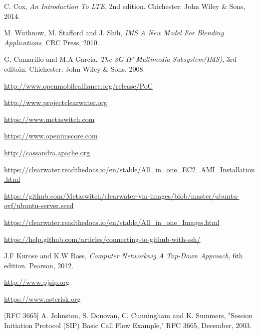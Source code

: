 \renewcommand\bibname{مراجع}
\begin{thebibliography}{99} %



\begin{LTRitems}

\resetlatinfont

C. Cox,  {\em An Introduction To LTE}, 2nd edition. Chichester: John Wiley \& Sons, 2014.

M. Wuthnow, M. Stafford and J. Shih,  {\em IMS A New Model For Blending Applications}. CRC Press, 2010.

G. Camarillo and M.A Garcia, {\em The 3G IP Multimedia Subsystem(IMS)}, 3rd editoin. Chichester: John Wiley \& Sons, 2008.

\url{http://www.openmobilealliance.org/release/PoC}

\url{http://www.projectclearwater.org}

\url{https://www.metaswitch.com}

\url{https://www.openimscore.com}

\url{http://cassandra.apache.org}

\url{https://clearwater.readthedocs.io/en/stable/All_in_one_EC2_AMI_Installation.html}

\url{https://github.com/Metaswitch/clearwater-vm-images/blob/master/ubuntu-ovf/ubuntu-server.seed}

\url{https://clearwater.readthedocs.io/en/stable/All_in_one_Images.html}

\url{https://help.github.com/articles/connecting-to-github-with-ssh/}

J.F Kurose and K.W Ross, {\em Computer Networknig A Top-Down Approach}, 6th edition. Pearson, 2012.

\url{http://www.pjsip.org}

\url{https://www.asterisk.org}

[RFC 3665] A. Johnston, S. Donovan, C. Cunningham and K. Summers, "Session Initiation Protocol (SIP) Basic Call Flow Example," RFC 3665, December, 2003.


\end{LTRitems}
\end{thebibliography}
